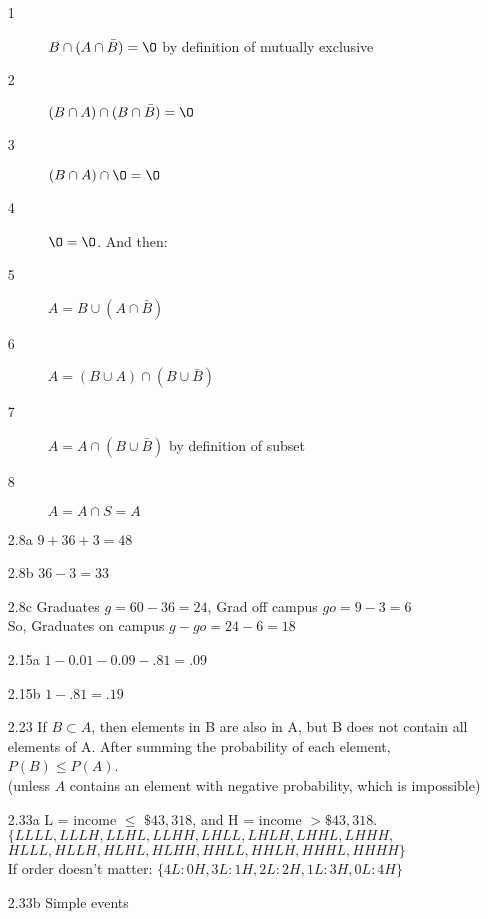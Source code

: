 \documentclass[11pt]{article}
\begin{document}
\begin{enumerate}
        \begin{description}
            \item[1] $B \cap (A \cap \bar{B}) = \O$ by definition of mutually exclusive
            \item[2] $(B \cap A) \cap (B \cap \bar{B}) = \O$
            \item[3] $(B \cap A) \cap \O = \O$
            \item[4] $\O = \O$. And then:
            \item[5] $A = B \cup (A \cap \bar{B})$
            \item[6] $A = (B \cup A) \cap (B \cup \bar{B})$
            \item[7] $A = A \cap (B \cup \bar{B})$ by definition of subset
            \item[8] $A = A \cap S = A$
        \end{description}
        \newpage
        \item[2.8a] $9 + 36 + 3 = 48$
        \item[2.8b] $36 - 3 = 33$
        \item[2.8c] Graduates $g = 60 - 36 = 24$, Grad off campus $go = 9 - 3 = 6$ \\
                    So, Graduates on campus $g - go = 24 - 6 = 18$
        \\
        \item[2.15a] $1 - 0.01 - 0.09 - .81 = .09$
        \item[2.15b] $1 - .81 = .19$
        \\
        \item[2.23 ] If $B \subset A$, then elements in B are also in A, but B does not contain all elements of A. After summing the probability of each element, $P(B) \leq P(A)$. \\
                    (unless $A$ contains an element with negative probability, which is impossible)
        \item[2.33a] L = income $\leq$ $\$43,318$, and H = income $> \$43,318$. \\
                        $\{LLLL, LLLH, LLHL, LLHH, LHLL, LHLH, LHHL, LHHH,$\\
                        $HLLL, HLLH, HLHL, HLHH, HHLL, HHLH, HHHL, HHHH\}$ \\
                    If order doesn't matter: $\{4L:0H, 3L:1H, 2L:2H, 1L:3H, 0L:4H\}$
        \item[2.33b] Simple events\\
        \begin{enumerate}

\end{enumerate}
\end{enumerate}
\end{document}
